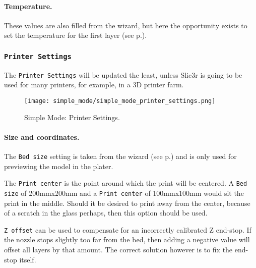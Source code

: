 \paragraph{Temperature.} %
\label{par:temperature}
These values are also filled from the wizard, but here the opportunity exists to set the temperature for the first layer (see p.\pageref{sec:the_important_first_layer}).


\subsubsection{\texttt{Printer Settings}}

The \texttt{Printer Settings} will be updated the least, unless Slic3r is going to be used for many printers, for example, in a 3D printer farm.

\begin{figure}[H]
\centering
\texttt{[image: simple\_mode/simple\_mode\_printer\_settings.png]}
\caption{Simple Mode: Printer Settings.}
\label{fig:simple_mode_printer_settings}
\end{figure}

\paragraph{Size and coordinates.} %
\label{par:size_and_coordinates}
The \texttt{Bed size} setting is taken from the wizard (see p.\pageref{sub:2_bed_size}) and is only used for previewing the model in the plater.

The \texttt{Print center} is the point around which the print will be centered.  A \texttt{Bed size} of 200mmx200mm and a \texttt{Print center} of 100mmx100mm would sit the print in the middle.  Should it be desired to print away from the center, because of a scratch in the glass perhaps, then this option should be used.

\texttt{Z offset} can be used to compensate for an incorrectly calibrated Z end-stop.  If the nozzle stops slightly too far from the bed, then adding a negative value will offset all layers by that amount.  The correct solution however is to fix the end-stop itself.

